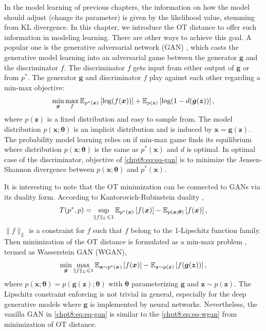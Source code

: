 \begin{remark}
  In the model learning of previous chapters, the information on how the model should adjust (change its parameter) is given by the likelihood value, stemming from KL divergence. In this chapter, we introduce the OT distance to offer such information in modeling learning. There are other ways to achieve this goal. A popular one is the generative adversarial network (GAN) \cite{NIPS2014_5423, 2017arXiv170100160G}, which casts the generative model learning into an adversarial game between the generator $\bm{g}$ and the discriminator $f$.
The {discriminator} $f$ gets input from either output of $\bm{g}$ or from
$p^{\ast}$. The generator $\bm{g}$ and discriminator ${f}$ play against each other
regarding a min-max objective:
\begin{equation}\label{chpt8:eq:eq-gan}
  \min_{\bm{g}} \max_f \mathbb{E}_{p^{\ast}(\bm{x})}\left[ \log(f(\bm{x})) \right] + \mathbb{E}_{p(\bm{z})}\left[ \log(1-d(\bm{g}(\bm{z})) \right],
\end{equation}
where $p(\bm{z})$ is a fixed distribution and easy to sample from. The model distribution $p(\bm{x}; \bm{\theta})$ is an implicit distribution and is induced by $\bm{x} = \bm{g}(\bm{z})$.
The probability model learning relies on if min-max game finds
its equilibrium where distribution $p(\bm{x}; \bm{\theta})$ is the same as $p^{\ast}(\bm{x})$ and
$d$ is optimal. In optimal case of the discriminator, objective of
\eqref{chpt8:eq:eq-gan} is to minimize the Jensen-Shannon divergence between $p(\bm{x}; \bm{\theta})$ and $p^{\ast}(\bm{x})$.
\end{remark}


\begin{remark}\label{chpt8:rmk:wgan}
  It is interesting to note that the OT minimization can be connected to GANs via its duality form. According to Kantorovich-Rubinstein duality \cite[section~2.4]{2018arXiv180300567P}\cite{villani2008optimal},
  \begin{equation}
     T(p^{\ast},p) = \sup_{\|f\|_{L} \leqslant 1} \mathbb{E}_{p^{\ast}(\bm{x})}\left[ f(\bm{x}) \right] -
  \mathbb{E}_{p(\bm{x};\bm{\theta})}\left[ f(\bm{x}) \right],
\end{equation}
$\|f\|_L$ is a constraint for $f$ such that $f$ belong to the 1-Lipschitz function
family. Then minimization of the OT distance is formulated as a min-max problem \cite{2017arXiv170107875A}, termed as Wasserstein GAN (WGAN),
\begin{equation}\label{chpt8:eq:eq-wgan}
  \min_{\bm{g}} \max_{\|f\|_{L} \leqslant 1} \mathbb{E}_{\bm{x} \sim p^{\ast}(\bm{x})}\left[ f(\bm{x}) \right] -
  \mathbb{E}_{\bm{z}\sim p(\bm{z})}\left[ f(\bm{g}(\bm{z})) \right],
\end{equation}
where $p(\bm{x};\bm{\theta}) = p(\bm{g}(\bm{z}); \bm{\theta})$ with $\bm{\theta}$ parameterizing $\bm{g}$ and $\bm{z}\sim p(\bm{z})$. The  Lipschitz constraint enforcing is not trivial in general, especially for the deep generative models where $\bm{g}$ is implemented by neural networks. Nevertheless, the vanilla GAN in \eqref{chpt8:eq:eq-gan} is similar to the \eqref{chpt8:eq:eq-wgan} from minimization of OT distance.
\end{remark}

